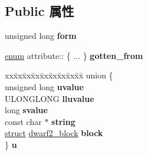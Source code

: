 \subsection*{Public 属性}
\begin{DoxyCompactItemize}
\item 
\mbox{\label{structattribute_a34d2230cdfd840e404d2cadb05e29985}} 
unsigned long {\bfseries form}
\item 
\mbox{\label{structattribute_a1d6544a9f8a5f3d1d388777b9aaf45f2}} 
\hyperlink{interfaceenum}{enum} attribute\+:: \{ ... \}  {\bfseries gotten\+\_\+from}
\item 
\mbox{\label{structattribute_a3b0c242d211b9d11bb583f1a6a71ca73}} 
\begin{tabbing}
xx\=xx\=xx\=xx\=xx\=xx\=xx\=xx\=xx\=\kill
union \{\\
\>unsigned long {\bfseries uvalue}\\
\>ULONGLONG {\bfseries lluvalue}\\
\>long {\bfseries svalue}\\
\>const char $\ast$ {\bfseries string}\\
\>\hyperlink{interfacestruct}{struct} \hyperlink{structdwarf2__block}{dwarf2\_block} {\bfseries block}\\
\} {\bfseries u}\\


\end{tabbing}
\end{DoxyCompactItemize}
